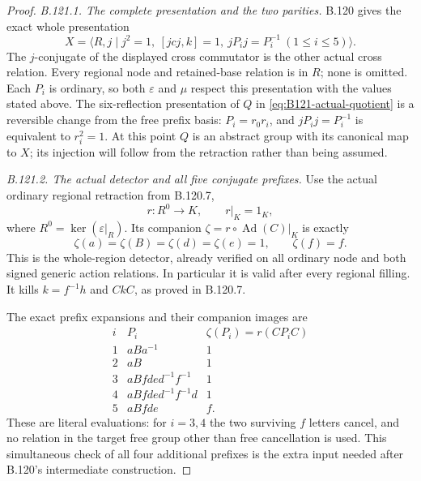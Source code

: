 \begin{proof}
\emph{B.121.1. The complete presentation and the two parities.}
B.120 gives the exact whole presentation
\begin{equation}\label{eq:B121-whole-presentation}
 X=\langle R,j\mid j^2=1,\ [jcj,k]=1,
                       \ jP_i j=P_i^{-1}\ (1\leq i\leq5)\rangle.
\end{equation}
The $j$-conjugate of the displayed cross commutator is the other
actual cross relation. Every regional node and retained-base
relation is in $R$; none is omitted. Each $P_i$ is ordinary,
so both $\varepsilon$ and $\mu$ respect this presentation with
the values stated above. The six-reflection presentation of $Q$
in \eqref{eq:B121-actual-quotient} is a reversible change from
the free prefix basis: $P_i=r_0r_i$, and
$jP_i j=P_i^{-1}$ is equivalent to $r_i^2=1$.
At this point $Q$ is an abstract group with its canonical map
to $X$; its injection will follow from the retraction rather
than being assumed.

\emph{B.121.2. The actual detector and all five conjugate prefixes.}
Use the actual ordinary regional retraction from B.120.7,
\[
 r:R^0\to K,\qquad r|_K=1_K,
\]
where $R^0=\ker(\varepsilon|_R)$. Its companion
$\zeta=r\circ\operatorname{Ad}(C)|_K$ is exactly
\begin{equation}\label{eq:B121-companion}
 \zeta(a)=\zeta(B)=\zeta(d)=\zeta(e)=1,
 \qquad \zeta(f)=f.
\end{equation}
This is the whole-region detector, already verified on all
ordinary node and both signed generic action relations. In
particular it is valid after every regional filling.
It kills $k=f^{-1}h$ and $CkC$, as proved in B.120.7.

The exact prefix expansions and their companion images are
\begin{equation}\label{eq:B121-prefix-images}
 \begin{array}{c|l|c}
 i&P_i&\zeta(P_i)=r(CP_iC)\\\hline
 1&aBa^{-1}&1\\
 2&aB&1\\
 3&aBfde d^{-1}f^{-1}&1\\
 4&aBfde d^{-1}f^{-1}d&1\\
 5&aBfde&f.
 \end{array}
\end{equation}
These are literal evaluations: for $i=3,4$ the two surviving
$f$ letters cancel, and no relation in the target free group
other than free cancellation is used. This simultaneous check
of all four additional prefixes is the extra input needed
after B.120's intermediate construction.


\end{proof}
